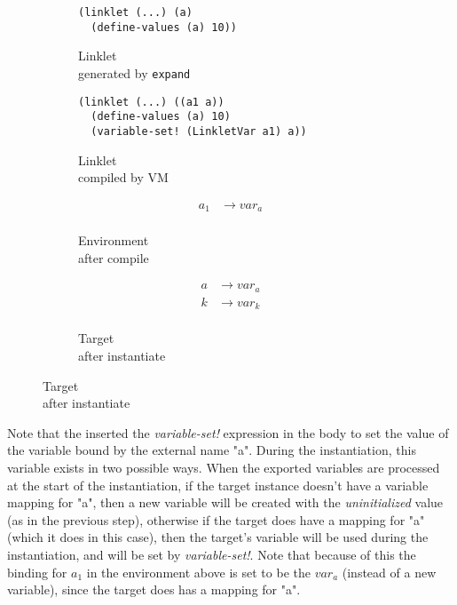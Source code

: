 \begin{figure}[h!]
  \small
  \begin{subfigure}[b]{0.26\textwidth}
    \begin{mdframed}
\begin{verbatim}
(linklet (...) (a)
  (define-values (a) 10))
\end{verbatim}
    \end{mdframed}
    \caption{Linklet \\ generated by \texttt{expand}}
    \label{fig:1}
  \end{subfigure}
  \begin{subfigure}[b]{0.38\textwidth}
    \begin{mdframed}
\begin{verbatim}
(linklet (...) ((a1 a))
  (define-values (a) 10)
  (variable-set! (LinkletVar a1) a))
\end{verbatim}
    \end{mdframed}
    \caption{Linklet \\ compiled by VM}
    \label{fig:2}
  \end{subfigure} \hfill
  \begin{subfigure}[b]{0.15\textwidth}
    \begin{mdframed}
      \begin{align*}
        a_1 &\rightarrow var_a \\
      \end{align*}
    \end{mdframed}
    \caption{Environment \\ after compile}
    \label{fig:2}
  \end{subfigure}
  \begin{subfigure}[b]{0.15\textwidth}
    \begin{mdframed}
      \begin{align*}
        a &\rightarrow var_a \\
        k &\rightarrow var_k \\
      \end{align*}
    \end{mdframed}
    \caption{Target \\ after instantiate}
    \label{fig:2}
  \end{subfigure}
\end{figure}

Note that the  inserted the \emph{variable-set!}
expression in the body to set the value of the variable bound by the
external name "a". During the instantiation, this variable exists in
two possible ways. When the exported variables are processed at the
start of the instantiation, if the target instance doesn't have a
variable mapping for "a", then a new variable will be created with the
\emph{uninitialized} value (as in the previous step), otherwise if the
target does have a mapping for "a" (which it does in this case), then
the target's variable will be used during the instantiation, and will
be set by \emph{variable-set!}. Note that because of this the binding
for $a_1$ in the environment above is set to be the $var_a$ (instead
of a new variable), since the target does has a mapping for "a".

